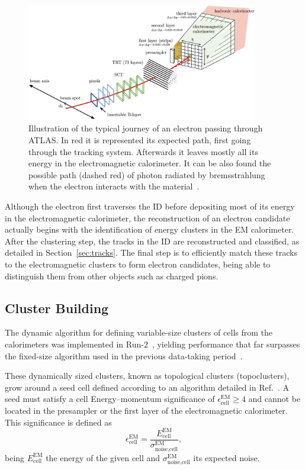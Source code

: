 \begin{figure}[htbp]
  \centering
  \includegraphics[width=0.9\textwidth]{images/electron_journey.png}
  \caption{Illustration of the typical journey of an electron passing through ATLAS. In red it is represented its expected path, first going through the tracking system. Afterwards it leaves mostly all its energy in the electromagnetic calorimeter. It can be also found the possible path (dashed red) of photon radiated by bremsstrahlung when the electron interacts with the material~\cite{Aaboud:2657964}.}
  \label{electron_journey}
\end{figure}
Although the electron first traverses the ID before depositing most of its energy in the electromagnetic calorimeter, the reconstruction of an electron candidate actually begins with the identification of energy clusters in the EM calorimeter. After the clustering step, 
the tracks in the ID are reconstructed and classified, as detailed in Section~\ref{sec:tracks}. The final step is to efficiently match these tracks to the electromagnetic clusters to form electron candidates, being able to distinguish them from other objects such as charged pions.

\subsection{Cluster Building}

The dynamic algorithm for defining variable-size clusters of cells from the calorimeters was implemented in Run-2~\cite{dyn_clust}, yielding performance that far surpasses the fixed-size algorithm used in the previous data-taking period~\cite{fix_clust}.

These dynamically sized clusters, known as topological clusters (topoclusters), grow around a seed cell defined according to an algorithm detailed in Ref.~\cite{fix_clust}. A seed must satisfy a cell Energy–momentum significance of $\epsilon_{\text{cell}}^{\text{EM}} \geq 4$
and cannot be located in the presampler or the first layer of the electromagnetic calorimeter. This significance is defined as
\begin{equation}
  \epsilon_{\text{cell}}^{\text{EM}} = \frac{E_{\text{cell}}^{\text{EM}}}{\sigma^{\text{EM}}_{\text{noise,cell}}},
\end{equation}
being \(E_{\text{cell}}^{\text{EM}}\) the energy of the given cell and \(\sigma^{\text{EM}}_{\text{noise,cell}}\) its expected noise.

